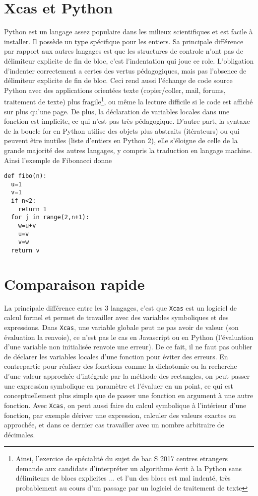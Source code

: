 \documentclass[12pt,a4paper]{book}
\begin{document}
\begin{giacjshere}
\section{Xcas et Python}
Python est un langage assez populaire
dans les milieux scientifiques et est facile \`a installer.
Il poss\`ede un type sp\'ecifique pour les entiers. 
Sa principale diff\'erence par rapport aux autres langages est
que les structures de controle n'ont pas de d\'elimiteur explicite
de fin de bloc, c'est l'indentation qui joue ce role. L'obligation
d'indenter correctement a certes des vertus p\'edagogiques, mais 
pas l'absence de d\'elimiteur explicite de fin de bloc. Ceci rend aussi
l'\'echange de code source Python avec des applications orient\'ees
texte (copier/coller, mail, forums, traitement de texte) 
plus fragile\footnote{Ainsi, l'exercice
de sp\'ecialit\'e du sujet de bac S
2017 centres etrangers demande aux candidats d'interpr\'eter un algorithme
\'ecrit \`a la Python sans d\'elimiteurs de blocs explicites ... et
l'un des blocs est mal indent\'e, tr\`es probablement au cours
d'un passage par un logiciel de traitement de texte}, 
ou m\^eme la lecture difficile si le code est affich\'e sur 
plus qu'une page.
De plus, la d\'eclaration
de variables locales dans une fonction
est implicite, ce qui n'est pas tr\`es p\'edagogique.
D'autre part, la syntaxe de la boucle
for en Python utilise des objets plus abstraits (it\'erateurs)
ou qui peuvent \^etre inutiles (liste d'entiers en Python 2), elle
s'\'eloigne de celle de la grande majorit\'e des
autres langages, y compris la traduction en langage machine.
Ainsi l'exemple de Fibonacci donne
\begin{verbatim}
def fibo(n):
  u=1 
  v=1
  if n<2:
    return 1
  for j in range(2,n+1):
    w=u+v 
    u=v 
    v=w 
  return v
\end{verbatim}

\section{Comparaison rapide}
La principale diff\'erence entre les 3 langages, c'est que {\tt Xcas}
est un logiciel de calcul formel et permet 
de travailler avec des variables symboliques et des
expressions. Dans {\tt Xcas}, une variable globale 
peut ne pas avoir de valeur (son \'evaluation la renvoie),
ce n'est pas le cas en Javascript ou en Python (l'\'evaluation
d'une variable non initialis\'ee renvoie une erreur). De ce fait,
il ne faut pas oublier de d\'eclarer les variables locales
d'une fonction pour \'eviter des erreurs. En contrepartie pour
r\'ealiser des fonctions comme la dichotomie ou la recherche
d'une valeur approch\'ee d'int\'egrale par la m\'ethode des 
rectangles,
on peut passer une expression symbolique en param\`etre et
l'\'evaluer en un point, ce qui est conceptuellement plus 
simple que de passer une
fonction en argument \`a une autre fonction.
Avec {\tt Xcas}, on peut aussi faire du calcul symbolique \`a l'int\'erieur
d'une fonction, par exemple d\'eriver une expression, calculer
des valeurs exactes ou approch\'ee, et dans ce dernier cas travailler
avec un nombre arbitraire de d\'ecimales.


\end{giacjshere}
\end{document}
